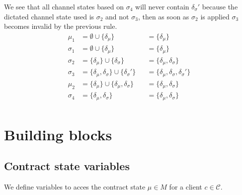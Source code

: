 \documentclass{llncs}
\begin{document}
We see that all channel states based on $\sigma_4$ will never contain $\delta_\sigma'$ because the dictated channel state used is $\sigma_2$ and not $\sigma_3$, then as soon as $\sigma_2$ is applied $\sigma_3$ becomes invalid by the previous rule.
\begin{align*}
    \mu_1    &= \emptyset \cup \{\delta_\mu\} & &= \{\delta_\mu\} \\
    \sigma_1 &= \emptyset \cup \{\delta_\mu\} & &= \{\delta_\mu\} \\
    \sigma_2 &= \{\delta_\mu\} \cup \{\delta_\sigma\} & &= \{\delta_\mu,\delta_\sigma\} \\
    \sigma_3 &= \{\delta_\mu,\delta_\sigma\}\cup\{\delta_\sigma'\} & &= \{\delta_\mu,\delta_\sigma,\delta_\sigma'\} \\
    \mu_2    &= \{\delta_\mu\} \cup \{\delta_\mu,\delta_\sigma\} & &= \{\delta_\mu,\delta_\sigma\} \\
    \sigma_4 &=  \{\delta_\mu,\delta_\sigma\} & &= \{\delta_\mu,\delta_\sigma\} \\
\end{align*}

%
%

\section{Building blocks}
\subsection{Contract state variables} We define variables to acces the contract state $\mu \in M$ for a client $c \in \mathcal{C}$.
\end{document}
